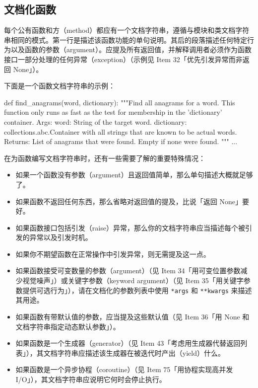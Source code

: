 \subsection{文档化函数}

每个公有函数和方（method）都应有一个文档字符串，遵循与模块和类文档字符串相同的模式。第一行是描述该函数功能的单句说明。其后的段落描述任何特定行为以及函数的参数（argument）。应提及所有返回值，并解释调用者必须作为函数接口一部分处理的任何异常（exception）（示例见 Item 32「优先引发异常而非返回 None」）。

下面是一个函数文档字符串的示例：

\begin{codebox}[python]
def find_anagrams(word, dictionary):
    """Find all anagrams for a word.
    This function only runs as fast as the test for
    membership in the 'dictionary' container.
    Args:
        word: String of the target word.
        dictionary: collections.abc.Container with all
            strings that are known to be actual words.
    Returns:
        List of anagrams that were found. Empty if
        none were found.
    """
    ...
\end{codebox}

在为函数编写文档字符串时，还有一些需要了解的重要特殊情况：

\begin{itemize}
\item 如果一个函数没有参数（argument）且返回值简单，那么单句描述大概就足够了。
\item 如果函数不返回任何东西，那么省略对返回值的提及，比说「返回 None」要好。
\item 如果函数接口包括引发（raise）异常，那么你的文档字符串应当描述每个被引发的异常以及引发时机。
\item 如果你不期望函数在正常操作中引发异常，则无需提及这一点。
\item 如果函数接受可变数量的参数（argument）（见 Item 34「用可变位置参数减少视觉噪声」）或关键字参数（keyword argument）（见 Item 35「用关键字参数提供可选行为」），请在文档化的参数列表中使用 \texttt{*args} 和 \texttt{**kwargs} 来描述其用途。
\item 如果函数有带默认值的参数，应当提及这些默认值（见 Item 36「用 None 和文档字符串指定动态默认参数」）。
\item 如果函数是一个生成器（generator）（见 Item 43「考虑用生成器代替返回列表」），其文档字符串应描述该生成器在被迭代时产出（yield）什么。
\item 如果函数是一个异步协程（coroutine）（见 Item 75「用协程实现高并发 I/O」），其文档字符串应说明它何时会停止执行。
\end{itemize}

